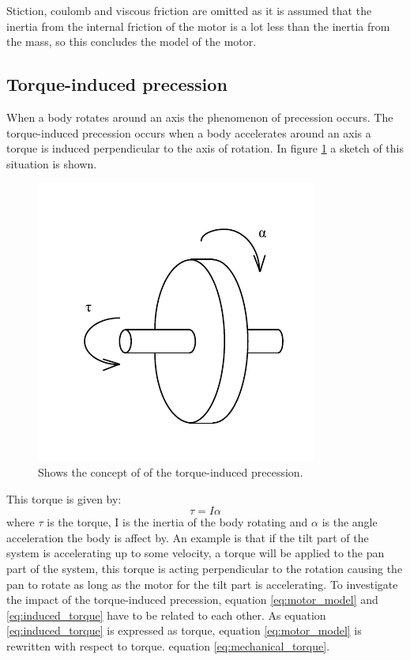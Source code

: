 Stiction, coulomb and viscous friction are omitted as it is assumed that the inertia from the internal friction of the motor is a lot less than the inertia from the mass, so this concludes the model of the motor.


  
\subsection{Torque-induced precession}
When a body rotates around an axis the phenomenon of precession occurs. The torque-induced precession occurs when a body accelerates around an axis a torque is induced perpendicular to the axis of rotation. In figure \ref{fig:precession} a sketch of this situation is shown.
\begin{figure}[htb]
	\centering
	\includegraphics[scale=1,trim=0 0 0 0]{graphics/precession.pdf} %
	\caption{Shows the concept of of the torque-induced precession.}
	\label{fig:precession}			%
\end{figure}
This torque is given by:
\begin{equation}
	\tau = I\alpha\label{eq:induced_torque}
\end{equation}
where $\tau$ is the torque, I is the inertia of the body rotating and $\alpha$ is the angle acceleration the body is affect by. An example is that if the tilt part of the system is accelerating up to some velocity, a torque will be applied to the pan part of the system, this torque is acting perpendicular to the rotation causing the pan to rotate as long as the motor for the tilt part is accelerating. To investigate the impact of the torque-induced precession, equation \ref{eq:motor_model} and \ref{eq:induced_torque} have to be related to each other. As equation \ref{eq:induced_torque} is expressed as torque, equation \ref{eq:motor_model} is rewritten with respect to torque. equation \ref{eq:mechanical_torque}.
